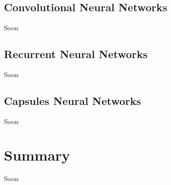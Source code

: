 \subsection{Convolutional Neural Networks}\label{sec:3.7.2}
\vspace{-0.5cm}
\noindent Soon


\vspace{-0.3cm}


\subsection{Recurrent Neural Networks}\label{sec:3.7.3}
\vspace{-0.5cm}
\noindent Soon


\vspace{-0.3cm}

\subsection{Capsules Neural Networks}\label{sec:3.7.4}
\vspace{-0.5cm}
\noindent Soon


\vspace{-0.3cm}




\section{Summary}\label{sec:3.6}
\vspace{-0.5cm}
\noindent Soon

\vspace{-0.3cm}



